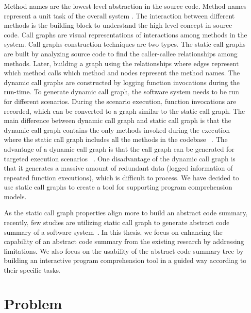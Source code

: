 Method names are the lowest level abstraction in the source code. Method names represent a unit task of the overall system \cite{de2012IRMethodsArtifacts, starke2009searching}. The interaction between different methods is the building block to understand the high-level concept in source code. Call graphs are visual representations of interactions among methods in the system. Call graphs construction techniques are two types. The static call graphs are built by analyzing source code to find the caller-callee relationships among methods. Later, building a graph using the relationships where edges represent which method calls which method and nodes represent the method names. The dynamic call graphs are constructed by logging function invocations during the run-time. To generate dynamic call graph, the software system needs to be run for different scenarios. During the scenario execution, function invocations are recorded, which can be converted to a graph similar to the static call graph. The main difference between dynamic call graph and static call graph is that the dynamic call graph contains the only methods invoked during the execution where the static call graph includes all the methods in the codebase ~\cite{gharibi2018automaticStaticCluster}. The advantage of a dynamic call graph is that the call graph can be generated for targeted execution scenarios ~\cite{feng2018hierarchicalExecutionComprehension}. One disadvantage of the dynamic call graph is that it generates a massive amount of redundant data (logged information of repeated function executions), which is difficult to process. We have decided to use static call graphs to create a tool for supporting program comprehension models. 

As the static call graph properties align more to build an abstract code summary, recently, few studies are utilizing static call graph to generate abstract code summary of a software system~\cite{gharibi2018automaticStaticCluster, walunj2019graphevoEvolutionCall}. In this thesis, we focus on enhancing the capability of an abstract code summary from the existing research by addressing limitations. We also focus on the usability of the abstract code summary tree by building an interactive program comprehension tool
in a guided way according to their specific tasks. 
 
\newpage


\section{Problem }
\label{intro:problem}
